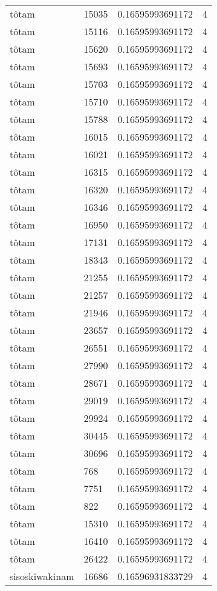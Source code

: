 \begin{longtable}{llll}
tôtam & 15035 & 0.16595993691172 & 4 \\
tôtam & 15116 & 0.16595993691172 & 4 \\
tôtam & 15620 & 0.16595993691172 & 4 \\
tôtam & 15693 & 0.16595993691172 & 4 \\
tôtam & 15703 & 0.16595993691172 & 4 \\
tôtam & 15710 & 0.16595993691172 & 4 \\
tôtam & 15788 & 0.16595993691172 & 4 \\
tôtam & 16015 & 0.16595993691172 & 4 \\
tôtam & 16021 & 0.16595993691172 & 4 \\
tôtam & 16315 & 0.16595993691172 & 4 \\
tôtam & 16320 & 0.16595993691172 & 4 \\
tôtam & 16346 & 0.16595993691172 & 4 \\
tôtam & 16950 & 0.16595993691172 & 4 \\
tôtam & 17131 & 0.16595993691172 & 4 \\
tôtam & 18343 & 0.16595993691172 & 4 \\
tôtam & 21255 & 0.16595993691172 & 4 \\
tôtam & 21257 & 0.16595993691172 & 4 \\
tôtam & 21946 & 0.16595993691172 & 4 \\
tôtam & 23657 & 0.16595993691172 & 4 \\
tôtam & 26551 & 0.16595993691172 & 4 \\
tôtam & 27990 & 0.16595993691172 & 4 \\
tôtam & 28671 & 0.16595993691172 & 4 \\
tôtam & 29019 & 0.16595993691172 & 4 \\
tôtam & 29924 & 0.16595993691172 & 4 \\
tôtam & 30445 & 0.16595993691172 & 4 \\
tôtam & 30696 & 0.16595993691172 & 4 \\
tôtam & 768 & 0.16595993691172 & 4 \\
tôtam & 7751 & 0.16595993691172 & 4 \\
tôtam & 822 & 0.16595993691172 & 4 \\
tôtam & 15310 & 0.16595993691172 & 4 \\
tôtam & 16410 & 0.16595993691172 & 4 \\
tôtam & 26422 & 0.16595993691172 & 4 \\
sisoskiwakinam & 16686 & 0.16596931833729 & 4 \\

\end{longtable}
